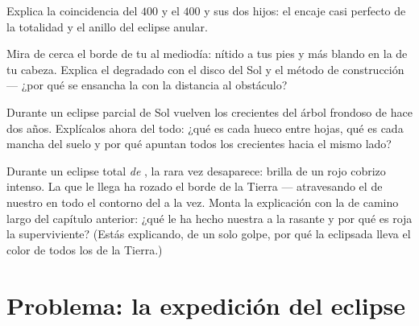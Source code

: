 \begin{exercise}[$\star\star$]\label{exo:g7:shadows-eclipses:9}
Explica la coincidencia del $400$ y el $400$ y sus dos hijos: el
encaje casi perfecto de la totalidad y el anillo del eclipse anular.
\end{exercise}

\begin{exercise}[$\star\star$]\label{exo:g7:shadows-eclipses:10}
Mira de cerca el borde de tu  al mediodía: nítido a tus pies y
más blando en la  de tu cabeza. Explica el degradado con el
disco del Sol y el método de construcción --- ¿por qué se ensancha la
 con la distancia al obstáculo?
\end{exercise}

\begin{exercise}[$\star\star$]\label{exo:g7:shadows-eclipses:11}
Durante un eclipse parcial de Sol vuelven los crecientes del
árbol frondoso de hace dos años. Explícalos ahora del todo: ¿qué es
cada hueco entre hojas, qué es cada mancha del suelo y por qué apuntan
todos los crecientes hacia el mismo lado?
\end{exercise}

\begin{exercise}[$\star\star\star$]\label{exo:g7:shadows-eclipses:12}
Durante un eclipse total \emph{de }, la  rara vez
desaparece: brilla de un rojo cobrizo intenso. La  que le llega
ha rozado el borde de la Tierra --- atravesando el  de nuestro
 en todo el contorno del  a la vez. Monta la
explicación con la  de camino largo del capítulo anterior:
¿qué le ha hecho nuestra  a la  rasante y por qué
es roja la  superviviente? (Estás explicando, de un solo golpe,
por qué la  eclipsada lleva el color de todos los
 de la Tierra.)
\end{exercise}

\section{Problema: la expedición del eclipse}

